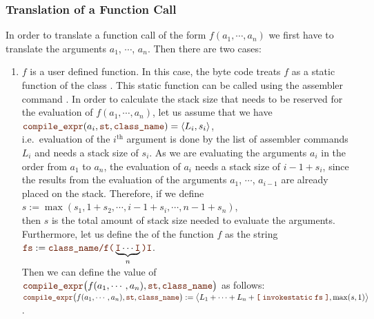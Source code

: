 \subsubsection{Translation of a Function Call}
In order to translate a function call of the form  $f(a_1, \cdots, a_n)$ we first have to translate the
arguments $a_1$, $\cdots$, $a_n$.  Then there are two cases:
\begin{enumerate}
\item $f$ is a user defined function.  In this case, the byte code treats $f$ as a static function of the
      class .  This static function can be called using the assembler command
      .  In order to calculate the stack size that needs to be reserved for the evaluation
      of  $f(a_1, \cdots, a_n)$, let us assume that we have
      \\[0.2cm]
      \hspace*{1.3cm}
      $\mytt{compile\_expr}(a_i, \mytt{st}, \mytt{class\_name}) = \pair(L_i, s_i)$,
      \\[0.2cm]
      i.e.~evaluation of the $i^\mathrm{th}$ argument is done by the list of assembler commands $L_i$ and
      needs a stack size of $s_i$.  As we are evaluating the arguments $a_i$ in the order from $a_1$ to $a_n$,
      the evaluation of $a_i$ needs a stack size of $i-1 + s_i$, since the results from the evaluation of
      the arguments $a_1$, $\cdots$, $a_{i-1}$ are already placed on the stack.  Therefore, if we define
      \\[0.2cm]
      \hspace*{1.3cm}
      $s := \max(s_1, 1 + s_2, \cdots, i - 1 + s_i, \cdots, n-1 + s_n)$,
      \\[0.2cm]
      then $s$ is the total amount of stack size needed to evaluate the arguments.  Furthermore, let us define
      the   of the function $f$ as the string
      \\[0.2cm]
      \hspace*{1.3cm}
      $\mytt{fs} := \mytt{class\_name/}\mytt{f(}\underbrace{\mytt{I}\cdots\mytt{I}}_{n}\mytt{)I}$.
      \\[0.2cm]
      Then we can define the
      value of
      $\mytt{compile\_expr}\bigl(f(a_1,\cdots,a_n), \mytt{st}, \mytt{class\_name}\bigr)$ as follows:
      \\[0.2cm]
      \hspace*{0.8cm}
      $\mytt{compile\_expr}\bigl(f(a_1,\cdots,a_n), \mytt{st}, \mytt{class\_name}\bigr) :=
      \bigl\langle L_1 + \cdots + L_n + \mytt{[} \; \mytt{invokestatic}\; \mytt{fs} \;\mytt{]}, \max(s,1)\bigr\rangle$.

\end{enumerate}
